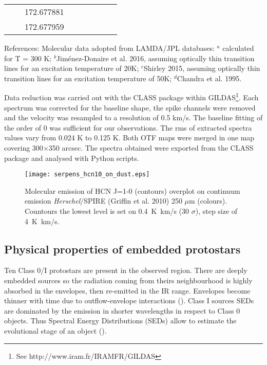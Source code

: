 \documentclass{aa}
\begin{document}
\begin{table*}
\begin{tabular}{c c c c c c c c c}
&  & 172.677881 &  &  &  & &  & \\
&  & 172.677959 &  &  &  & &  & \\
\hline                                   
\end{tabular}
\begin{flushleft}
References: 
Molecular data adopted from LAMDA/JPL databases: $^a$ calculated for T = 300 K;
$^b$Jim\'enez-Donaire et al. 2016, assuming optically thin transition lines for an excitation temperature of 20K;
$^c$Shirley 2015, assuming optically thin transition lines for an excitation temperature of 50K;
$^d$Chandra et al. 1995.
\end{flushleft}
\end{table*}

Data reduction was carried out with the CLASS package within GILDAS\footnote{See http://www.iram.fr/IRAMFR/GILDAS}. Each spectrum was corrected for the baseline shape, the spike channels were removed and the velocity was resampled to a resolution of 0.5 km/s. The baseline fitting of the order of 0 was sufficient for our observations. The rms of extracted spectra values vary from 0.024 K to 0.125 K. Both OTF maps were merged in one map covering 300$\times$350 arcsec. The spectra obtained were exported from the CLASS package and analysed with Python scripts. 

\begin{figure}
   \texttt{[image: serpens\_hcn10\_on\_dust.eps]}
      \caption{Molecular emission of HCN J=1-0 (contours) overplot on continuum emission \textit{Herschel}/SPIRE (Griffin et al. 2010) 250 $\mu$m (colours). Countours the lowest level is set on 0.4~K~km/s (30 $\sigma$), step size of 4~K~km/s.}
         \label{seds}
   \end{figure}



\subsection{Physical properties of embedded protostars}

Ten Class 0/I protostars are present in the observed region. There are deeply embedded sources so the radiation coming from theirs neighbourhood is highly absorbed in the envelopes, then re-emitted in the IR range. Envelopes become thinner with time due to outflow-envelope interactions (\citealt{Arc06}). Class I sources SEDs are dominated by the emission in shorter wavelengths in respect to Class 0 objects. Thus Spectral Energy Distributions (SEDs) allow to estimate the evolutional stage of an object (\citealt{And93}). 
\end{document}
